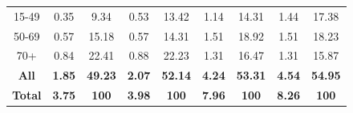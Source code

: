 \begin{landscape}
\begin{table}[htbp]
\begin{tabular}{c|cc|cc|cc|cc}
    15-49 & 0.35  & 9.34  & 0.53  & 13.42 & 1.14  & 14.31 & 1.44  & 17.38 \\
    50-69 & 0.57  & 15.18 & 0.57  & 14.31 & 1.51  & 18.92 & 1.51  & 18.23 \\
    70+   & 0.84  & 22.41 & 0.88  & 22.23 & 1.31  & 16.47 & 1.31  & 15.87 \\
    \midrule
    \textbf{All } & \textbf{1.85} & \textbf{49.23} & \textbf{2.07} & \textbf{52.14} & \textbf{4.24} & \textbf{53.31} & \textbf{4.54} & \textbf{54.95} \\
    \midrule
    \textbf{Total} & \textbf{3.75} & \textbf{100} & \textbf{3.98} & \textbf{100} & \textbf{7.96} & \textbf{100} & \textbf{8.26} & \textbf{100} \\
    \bottomrule
    \bottomrule
    \end{tabular}%
\label{ch5:tabS2}
\end{table}%

  



\end{landscape}
